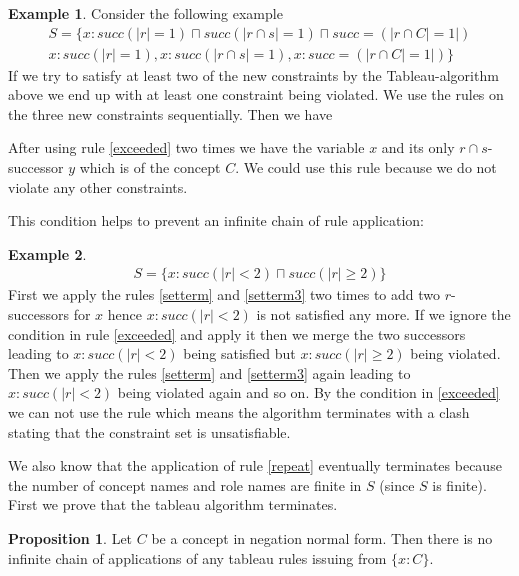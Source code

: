 \documentclass[a4paper,11pt]{scrartcl}
\theoremstyle{break}
\theoremstyle{definition}
\newtheorem{mypro}{Proposition}
\newtheorem{ex}{Example}
\begin{document}
\begin{ex}
Consider the following example 
\begin{align*}
S=\{x:succ(|r|=1)\sqcap succ(|r\cap s|=1)\sqcap succ=(|r\cap C|=1|)\\
x:succ(|r|=1), x:succ(|r\cap s|=1), x:succ=(|r\cap C|=1|)
\}
\end{align*}
If we try to satisfy at least two of the new constraints by the Tableau-algorithm above we end up with at least one constraint being violated. We use the rules on the three new constraints sequentially. Then we have 
\begin{figure}[H]
\centering
{}
\end{figure}
After using rule \ref{exceeded} two times we have the variable $x$ and its only $r\cap s$-successor $y$ which is of the concept $C$. We could use this rule because we do not violate any other constraints. 
\end{ex}
This condition helps to prevent an infinite chain of rule application:
\begin{ex}
\begin{align*}
S=\{x:succ(|r|<2)\sqcap succ(|r|\geq 2)\}	
\end{align*}
First we apply the rules \ref{setterm} and \ref{setterm3} two times to add two $r$-successors for $x$ hence $x:succ(|r|<2)$ is not satisfied any more. If we ignore the condition in rule \ref{exceeded} and apply it then we merge the two successors leading to $x:succ(|r|<2)$ being satisfied but $x:succ(|r|\geq 2)$ being violated. Then we apply the rules \ref{setterm} and \ref{setterm3} again leading to $x:succ(|r|<2)$ being violated again and so on. By the condition in \ref{exceeded} we can not use the rule which means the algorithm terminates with a clash stating that the constraint set is unsatisfiable.
\end{ex}
We also know that the application of rule \ref{repeat} eventually terminates because the number of concept names and role names are finite in $S$ (since $S$ is finite).\\ 
First we prove that the tableau algorithm terminates. 
\begin{mypro}
Let $C$ be a concept in negation normal form. Then there is no infinite chain of applications of any tableau rules issuing from $\{x:C\}$. 
\end{mypro}
\end{document}
